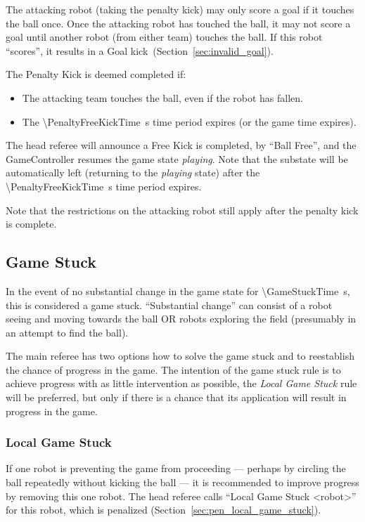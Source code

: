 The attacking robot (taking the penalty kick) may only score a goal if it touches the ball once.
Once the attacking robot has touched the ball, it may not score a goal until another robot (from either team) touches the ball.
If this robot ``scores'', it results in a Goal kick~(\cf Section~\ref{sec:invalid_goal}).

The Penalty Kick is deemed completed if:
\begin{itemize}
\item The attacking team touches the ball, even if the robot has fallen.
\item The \qty{\PenaltyFreeKickTime}{\second} time period expires (or the game time expires).
\end{itemize}

The head referee will announce a Free Kick is completed, by ``Ball Free'', and the GameController
resumes the game state \emph{playing}. Note that the substate will be automatically left (returning to the \textit{playing} state) after the \qty{\PenaltyFreeKickTime}{\second} time period expires.

Note that the restrictions on the attacking robot still apply after the penalty kick is complete.

\subsection{Game Stuck}
\label{sec:game_stuck}

In the event of no substantial change in the game state for \qty{\GameStuckTime}{\second}, this is considered a game stuck.  ``Substantial change'' can consist of a robot seeing and moving towards the ball OR robots exploring the field (presumably in an attempt to find the ball).

The main referee has two options how to solve the game stuck and to reestablish the chance of progress in the game. The intention of the game stuck rule is to achieve progress with as little intervention as possible, \ie the \emph{Local Game Stuck} rule will be preferred, but only if there is a chance that its application will result in progress in the game.

\subsubsection{Local Game Stuck}
\label{sec:game_stuck:local}

If one robot is preventing the game from proceeding --- perhaps by circling the ball repeatedly without kicking the ball --- it is recommended to improve progress by removing this one robot.
The head referee calls ``Local Game Stuck \textless robot\textgreater'' for this robot, which is penalized (\cf Section~\ref{sec:pen_local_game_stuck}).

